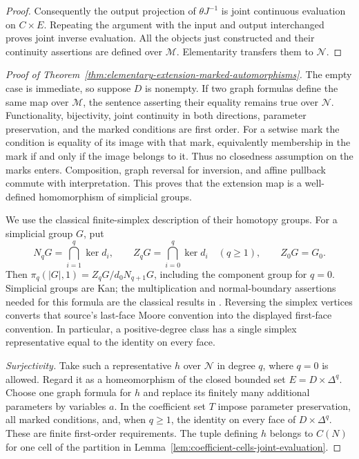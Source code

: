\begin{proof}
Consequently the output projection of $\theta J^{-1}$ is joint
continuous evaluation on $C\times E$.  Repeating the argument with
the input and output interchanged proves joint inverse evaluation.
All the objects just constructed and their continuity assertions are
defined over $\mathcal M$.  Elementarity transfers them to
$\mathcal N$.
\end{proof}

\begin{proof}[Proof of Theorem~\ref{thm:elementary-extension-marked-automorphisms}]
The empty case is immediate, so suppose $D$ is nonempty.
If two graph formulas define the same map over $\mathcal M$, the
sentence asserting their equality remains true over $\mathcal N$.
Functionality, bijectivity, joint continuity in both directions,
parameter preservation, and the marked conditions are first order.
For a setwise mark the condition is equality of its image with that
mark, equivalently membership in the mark if and only if the image
belongs to it.  Thus no closedness assumption on the marks enters.
Composition, graph reversal for inversion, and affine pullback
commute with interpretation.  This proves that the extension map
is a well-defined homomorphism of simplicial groups.

We use the classical finite-simplex description of their homotopy
groups.  For a simplicial group $G$, put
\[
 N_qG=\bigcap_{i=1}^q\ker d_i,\qquad
 Z_qG=\bigcap_{i=0}^q\ker d_i\quad(q\geq1),\qquad Z_0G=G_0.
\]
Then $\pi_q(|G|,1)=Z_qG/d_0N_{q+1}G$, including the component
group for $q=0$.  Simplicial groups are Kan; the multiplication and
normal-boundary assertions needed for this formula are the classical
results in \cite[Theorem~16.6, p.~65; Theorem~17.1 and
Propositions~17.2--17.4, pp.~67--69]{May1967Simplicial}.
Reversing the simplex vertices converts that source's last-face
Moore convention into the displayed first-face convention.  In particular, a positive-degree
class has a single simplex representative equal to the identity
on every face.

\medskip\noindent\textit{Surjectivity.}
Take such a representative $h$ over $\mathcal N$ in degree $q$,
where $q=0$ is allowed.  Regard it as a homeomorphism of the closed
bounded set $E=D\times\Delta^q$.  Choose one graph formula for $h$
and replace its finitely many additional parameters by variables
$a$.  In the coefficient set $T$ impose parameter preservation, all
marked conditions, and, when $q\geq1$, the identity on every face
of $D\times\Delta^q$.  These are finite first-order requirements.
The tuple defining $h$ belongs to $C(N)$ for one cell of the
partition in Lemma~\ref{lem:coefficient-cells-joint-evaluation}.


\end{proof}
